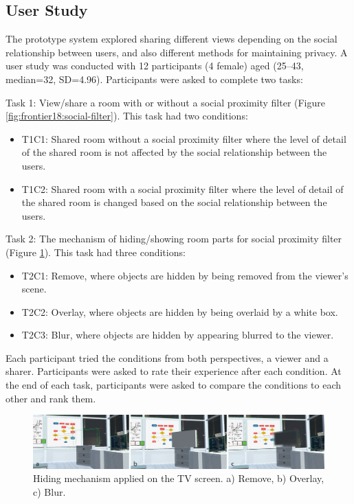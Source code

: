 \subsection{User Study}

The prototype system explored sharing different views depending on the social relationship between users, and also different methods for maintaining privacy. A user study was conducted with 12 participants (4 female) aged (25–43, median=32, SD=4.96). Participants were asked to complete two tasks: 

Task 1: View/share a room with or without a social proximity filter (Figure \ref{fig:frontier18:social-filter}). This task had two conditions: 

\begin{itemize}
\item T1C1: Shared room without a social proximity filter where the level of detail of the shared room is not affected by the social relationship between the users.
\item T1C2: Shared room with a social proximity filter where the level of detail of the shared room is changed based on the social relationship between the users. 
\end{itemize}

Task 2: The mechanism of hiding/showing room parts for social proximity filter (Figure \ref{fig:frontier18:hiding-mechanism}). This task had three conditions:

\begin{itemize}
\item T2C1: Remove, where objects are hidden by being removed from the viewer's scene.
\item T2C2: Overlay, where objects are hidden by being overlaid by a white box. 
\item T2C3: Blur, where objects are hidden by appearing blurred to the viewer. 
\end{itemize}

Each participant tried the conditions from both perspectives, a viewer and a sharer. Participants were asked to rate their experience after each condition. At the end of each task, participants were asked to compare the conditions to each other and rank them. 

\begin{figure}
\begin{center}
\includegraphics[width=\linewidth]{images/frontier18/images-01.png}
\caption{Hiding mechanism applied on the TV screen. a) Remove, b) Overlay, c) Blur.}\label{fig:frontier18:hiding-mechanism}
\end{center}
\end{figure}

